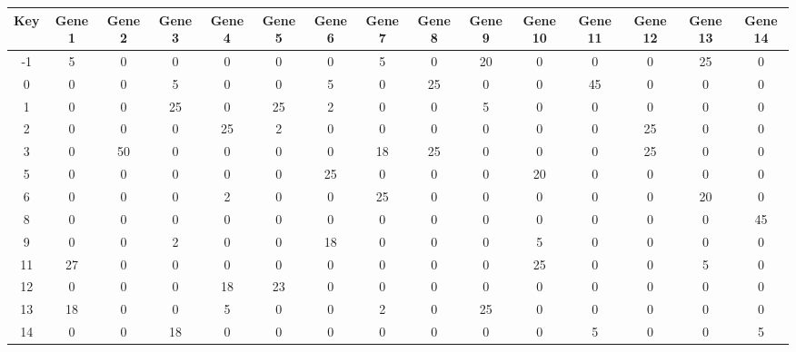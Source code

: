 \begin{tabular}{|c|c|c|c|c|c|c|c|c|c|c|c|c|c|c|}
\hline
Key & Gene 1 & Gene 2 & Gene 3 & Gene 4 & Gene 5 & Gene 6 & Gene 7 & Gene 8 & Gene 9 & Gene 10 & Gene 11 & Gene 12 & Gene 13 & Gene 14 \\
\hline
-1 & 5 & 0 & 0 & 0 & 0 & 0 & 5 & 0 & 20 & 0 & 0 & 0 & 25 & 0 \\
0 & 0 & 0 & 5 & 0 & 0 & 5 & 0 & 25 & 0 & 0 & 45 & 0 & 0 & 0 \\
1 & 0 & 0 & 25 & 0 & 25 & 2 & 0 & 0 & 5 & 0 & 0 & 0 & 0 & 0 \\
2 & 0 & 0 & 0 & 25 & 2 & 0 & 0 & 0 & 0 & 0 & 0 & 25 & 0 & 0 \\
3 & 0 & 50 & 0 & 0 & 0 & 0 & 18 & 25 & 0 & 0 & 0 & 25 & 0 & 0 \\
5 & 0 & 0 & 0 & 0 & 0 & 25 & 0 & 0 & 0 & 20 & 0 & 0 & 0 & 0 \\
6 & 0 & 0 & 0 & 2 & 0 & 0 & 25 & 0 & 0 & 0 & 0 & 0 & 20 & 0 \\
8 & 0 & 0 & 0 & 0 & 0 & 0 & 0 & 0 & 0 & 0 & 0 & 0 & 0 & 45 \\
9 & 0 & 0 & 2 & 0 & 0 & 18 & 0 & 0 & 0 & 5 & 0 & 0 & 0 & 0 \\
11 & 27 & 0 & 0 & 0 & 0 & 0 & 0 & 0 & 0 & 25 & 0 & 0 & 5 & 0 \\
12 & 0 & 0 & 0 & 18 & 23 & 0 & 0 & 0 & 0 & 0 & 0 & 0 & 0 & 0 \\
13 & 18 & 0 & 0 & 5 & 0 & 0 & 2 & 0 & 25 & 0 & 0 & 0 & 0 & 0 \\
14 & 0 & 0 & 18 & 0 & 0 & 0 & 0 & 0 & 0 & 0 & 5 & 0 & 0 & 5 \\
\hline
\end{tabular}